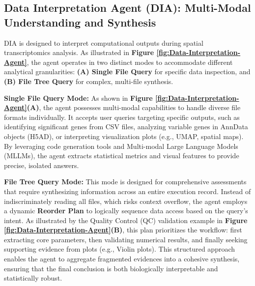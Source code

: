 \documentclass[11pt,a4paper]{article}
\begin{document}
\subsection{Data Interpretation Agent (DIA): Multi-Modal Understanding and Synthesis}

DIA is designed to interpret computational outputs during spatial transcriptomics analysis. As illustrated in \textbf{Figure \ref{fig:Data-Interpretation-Agent}}, the agent operates in two distinct modes to accommodate different analytical granularities: \textbf{(A) Single File Query} for specific data inspection, and \textbf{(B) File Tree Query} for complex, multi-file synthesis.

\textbf{Single File Query Mode:} As shown in \textbf{Figure \ref{fig:Data-Interpretation-Agent}(A)}, the agent possesses multi-modal capabilities to handle diverse file formats individually. It accepts user queries targeting specific outputs, such as identifying significant genes from CSV files, analyzing variable genes in AnnData objects (H5AD), or interpreting visualization plots (e.g., UMAP, spatial maps). By leveraging code generation tools and Multi-modal Large Language Models (MLLMs), the agent extracts statistical metrics and visual features to provide precise, isolated answers.

\textbf{File Tree Query Mode:} This mode is designed for comprehensive assessments that require synthesizing information across an entire execution record. Instead of indiscriminately reading all files, which risks context overflow, the agent employs a dynamic \textbf{Reorder Plan} to logically sequence data access based on the query's intent. As illustrated by the Quality Control (QC) validation example in \textbf{Figure \ref{fig:Data-Interpretation-Agent}(B)}, this plan prioritizes the workflow: first extracting core parameters, then validating numerical results, and finally seeking supporting evidence from plots (e.g., Violin plots). This structured approach enables the agent to aggregate fragmented evidences into a cohesive synthesis, ensuring that the final conclusion is both biologically interpretable and statistically robust.
\end{document}
